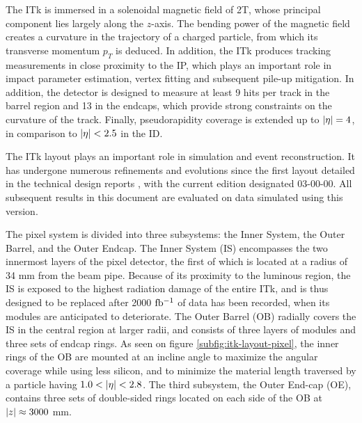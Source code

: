The ITk is immersed in a solenoidal magnetic field of 2T, whose principal component lies largely along the $z$-axis. 
The bending power of the magnetic field creates a curvature in the trajectory of a charged particle, from which its transverse momentum $p_T$ is deduced. 
In addition, the ITk produces tracking measurements in close proximity to the IP, which plays an important role in impact parameter estimation, vertex fitting and subsequent pile-up mitigation.
In addition, the detector is designed to measure at least 9 hits per track in the barrel region and 13 in the endcaps, which provide strong constraints on the curvature of the track. 
Finally, pseudorapidity coverage is extended up to $\abs{\eta}=4$, in comparison to $\abs{\eta}<2.5$ in the ID. 

The ITk layout plays an important role in simulation and event reconstruction. 
It has undergone numerous refinements and evolutions since the first layout detailed in the technical design reports \cite{ATLAS-TDR-25, ATLAS-TDR-30}, with the current edition designated 03-00-00. 
All subsequent results in this document are evaluated on data simulated using this version. 

The pixel system is divided into three subsystems: the Inner System, the Outer Barrel, and the Outer Endcap. 
The Inner System (IS) encompasses the two innermost layers of the pixel detector, the first of which is located at a radius of 34 mm from the beam pipe. 
Because of its proximity to the luminous region, the IS is exposed to the highest radiation damage of the entire ITk, and is thus designed to be replaced after 2000 $\mbox{fb\(^{-1}\)}$ of data has been recorded, when its modules are anticipated to deteriorate. 
The Outer Barrel (OB) radially covers the IS in the central region at larger radii, and consists of three layers of modules and three sets of endcap rings. 
As seen on figure \ref{subfig:itk-layout-pixel}, the inner rings of the OB are mounted at an incline angle to maximize the angular coverage while using less silicon, and to minimize the material length traversed by a particle having $1.0<\abs{\eta}<2.8$. 
The third subsystem, the Outer End-cap (OE), contains three sets of double-sided rings located on each side of the OB at $\abs{z}\approx 3000$ mm.

